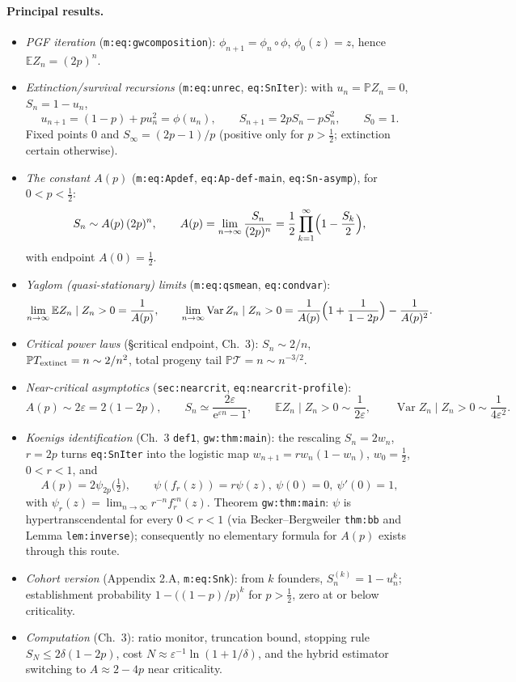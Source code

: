 \documentclass[11pt,a4paper]{article}
\newcommand{\PR}{\mathbb{P}}
\newcommand{\EX}{\mathbb{E}}
\newcommand{\Var}{\operatorname{Var}}
\newcommand{\ee}{\mathrm{e}}
\begin{document}
\paragraph{Principal results.}
\begin{itemize}
\item \emph{PGF iteration} (\texttt{m:eq:gwcomposition}): $\phi_{n+1}=
  \phi_n\circ\phi$, $\phi_0(z)=z$, hence $\EX{Z_n}=(2p)^n$.
\item \emph{Extinction/survival recursions} (\texttt{m:eq:unrec},
  \texttt{eq:SnIter}): with $u_n=\PR{Z_n=0}$, $S_n=1-u_n$,
  \[
  u_{n+1}=(1-p)+pu_n^2=\phi(u_n),\qquad
  S_{n+1}=2pS_n-pS_n^2,\qquad S_0=1.
  \]
  Fixed points $0$ and $S_\infty=(2p-1)/p$ (positive only for $p>\tfrac12$;
  extinction certain otherwise).
\item \emph{The constant $A(p)$} (\texttt{m:eq:Apdef},
  \texttt{eq:Ap-def-main}, \texttt{eq:Sn-asymp}), for $0<p<\tfrac12$:
  \[
  S_n\sim A(p)\,(2p)^n,\qquad
  A(p)=\lim_{n\to\infty}\frac{S_n}{(2p)^n}
  =\frac12\prod_{k=1}^{\infty}\Bigl(1-\frac{S_k}{2}\Bigr),
  \]
  with endpoint $A(0)=\tfrac12$.
\item \emph{Yaglom (quasi-stationary) limits}
  (\texttt{m:eq:qsmean}, \texttt{eq:condvar}):
  \[
  \lim_{n\to\infty}\EX{Z_n\mid Z_n>0}=\frac{1}{A(p)},\qquad
  \lim_{n\to\infty}\Var{Z_n\mid Z_n>0}
  =\frac{1}{A(p)}\Bigl(1+\frac{1}{1-2p}\Bigr)-\frac{1}{A(p)^2}.
  \]
\item \emph{Critical power laws} (\S critical endpoint, Ch.~3):
  $S_n\sim 2/n$, $\PR{T_{\rm extinct}=n}\sim2/n^2$, total progeny tail
  $\PR{\mathcal T=n}\sim n^{-3/2}$.
\item \emph{Near-critical asymptotics}
  (\texttt{sec:nearcrit}, \texttt{eq:nearcrit-profile}):
  \[
  A(p)\sim2\varepsilon=2(1-2p),\qquad
  S_n\simeq\frac{2\varepsilon}{\ee^{\varepsilon n}-1},\qquad
  \EX{Z_n\mid Z_n>0}\sim\frac{1}{2\varepsilon},\qquad
  \Var{Z_n\mid Z_n>0}\sim\frac{1}{4\varepsilon^2}.
  \]
\item \emph{Koenigs identification} (Ch.~3 \texttt{def1},
  \texttt{gw:thm:main}): the rescaling $S_n=2w_n$, $r=2p$ turns
  \texttt{eq:SnIter} into the logistic map
  $w_{n+1}=rw_n(1-w_n)$, $w_0=\tfrac12$, $0<r<1$, and
  \[
  A(p)=2\psi_{2p}\bigl(\tfrac12\bigr),
  \qquad \psi(f_r(z))=r\psi(z),\ \psi(0)=0,\ \psi'(0)=1,
  \]
  with $\psi_r(z)=\lim_{n\to\infty}r^{-n}f_r^{\circ n}(z)$. Theorem
  \texttt{gw:thm:main}: $\psi$ is hypertranscendental for every $0<r<1$
  (via Becker--Bergweiler \texttt{thm:bb} and Lemma \texttt{lem:inverse});
  consequently no elementary formula for $A(p)$ exists through this route.
\item \emph{Cohort version} (Appendix 2.A, \texttt{m:eq:Snk}): from $k$
  founders, $S_n^{(k)}=1-u_n^k$; establishment probability
  $1-\bigl((1-p)/p\bigr)^k$ for $p>\tfrac12$, zero at or below criticality.
\item \emph{Computation} (Ch.~3): ratio monitor, truncation bound, stopping
  rule $S_N\le2\delta(1-2p)$, cost $N\approx\varepsilon^{-1}\ln(1+1/\delta)$,
  and the hybrid estimator switching to $A\approx2-4p$ near criticality.
\end{itemize}
\end{document}
